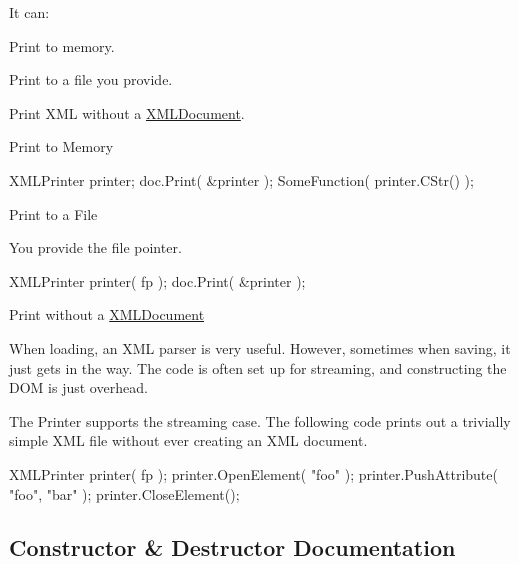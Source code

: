 It can\+:
\begin{DoxyEnumerate}
\item Print to memory.
\item Print to a file you provide.
\item Print X\+M\+L without a \hyperlink{classtinyxml2_1_1_x_m_l_document}{X\+M\+L\+Document}.
\end{DoxyEnumerate}

Print to Memory

\begin{DoxyVerb}XMLPrinter printer;
doc.Print( &printer );
SomeFunction( printer.CStr() );
\end{DoxyVerb}


Print to a File

You provide the file pointer. \begin{DoxyVerb}XMLPrinter printer( fp );
doc.Print( &printer );
\end{DoxyVerb}


Print without a \hyperlink{classtinyxml2_1_1_x_m_l_document}{X\+M\+L\+Document}

When loading, an X\+M\+L parser is very useful. However, sometimes when saving, it just gets in the way. The code is often set up for streaming, and constructing the D\+O\+M is just overhead.

The Printer supports the streaming case. The following code prints out a trivially simple X\+M\+L file without ever creating an X\+M\+L document.

\begin{DoxyVerb}XMLPrinter printer( fp );
printer.OpenElement( "foo" );
printer.PushAttribute( "foo", "bar" );
printer.CloseElement();
\end{DoxyVerb}
 

\subsection{Constructor \& Destructor Documentation}
\hypertarget{classtinyxml2_1_1_x_m_l_printer_aa6d3841c069085f5b8a27bc7103c04f7}{}
